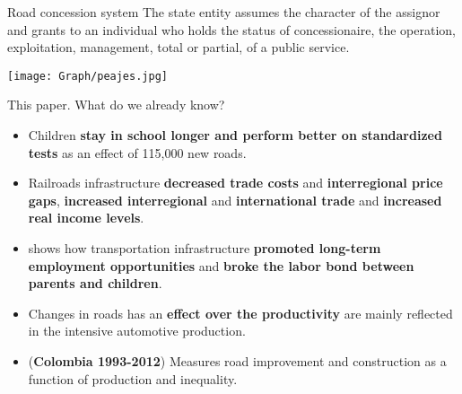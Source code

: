 \documentclass[9pt]{beamer}
\begin{document}
\begin{frame}{Road concession system } \label{roads1} 
\justifying
The state entity assumes the character of the assignor and grants to an individual who holds the status of concessionaire, the operation, exploitation, management, total or partial, of a public service.

\centering\texttt{[image: Graph/peajes.jpg]}

\hyperlink{general_context}{}
\end{frame}
\begin{frame}{This paper. \hyperlink{contribution}{}}
\label{rev.literature}
\justifying 
What do we already know?
    \begin{itemize}
      
            \item   \cite{Adukia2020} Children \textbf{stay in school longer and perform better on standardized tests} as an effect of 115,000 new roads.
            \item    \cite{Donaldson2010} Railroads infrastructure  \textbf{decreased trade costs} and \textbf{interregional price gaps}, \textbf{increased interregional} and \textbf{international trade} and \textbf{increased real income levels}.
            \item  \cite{Fernandez2020} shows how transportation infrastructure \textbf{promoted long-term employment opportunities} and \textbf{broke the labor bond between parents and children}.
            \item   \cite{Fernald1999} Changes in roads has an \textbf{effect over the productivity} are mainly reflected in the intensive automotive production.
            \item   \cite{Sinisterra} (\textbf{Colombia 1993-2012})  Measures road improvement and construction as a function of production and inequality.
       
    \end{itemize}

    
\end{frame}
\end{document}
